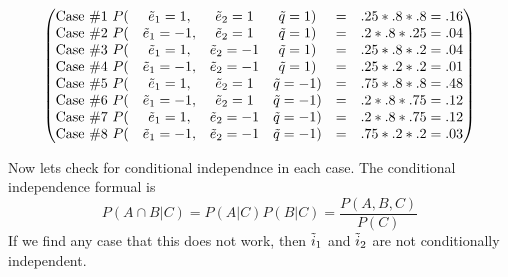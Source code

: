 \documentclass[12pt,twoside]{article}
\begin{document}
\begin{enumerate}
\begin{enumerate}
$$
    \begin{pmatrix}
    \text{Case \#1 } P( & \Tilde{e}_1 = 1, & \Tilde{e}_2 = 1 & \Tilde{q}=1) & = & .25*.8*.8 = .16\\
    \text{Case \#2 }  P( & \Tilde{e}_1 = -1, & \Tilde{e}_2 = 1 & \Tilde{q}=1) & = & .2*.8*.25 = .04\\
     \text{Case \#3 }   P( & \Tilde{e}_1 = 1, & \Tilde{e}_2 = -1 & \Tilde{q}=1) & = & .25*.8*.2 = .04\\
    \text{Case \#4 }    P( & \Tilde{e}_1 = -1, & \Tilde{e}_2 = -1 & \Tilde{q}=1) & = & .25*.2*.2 = .01\\
    \text{Case \#5 }       P( & \Tilde{e}_1 = 1, & \Tilde{e}_2 = 1 & \Tilde{q}=-1) & = & .75*.8*.8 = .48\\
    \text{Case \#6 }  P( & \Tilde{e}_1 = -1, & \Tilde{e}_2 = 1 & \Tilde{q}=-1) & = & .2*.8*.75 = .12\\
    \text{Case \#7 }    P( & \Tilde{e}_1 = 1, & \Tilde{e}_2 = -1 & \Tilde{q}=-1) & = & .2*.8*.75 = .12\\
    \text{Case \#8 }    P( & \Tilde{e}_1 = -1, & \Tilde{e}_2 = -1 & \Tilde{q}=-1) & = & .75*.2*.2 = .03\\
    \end{pmatrix} 
$$

Now lets check for conditional independnce in each case. The conditional independence formual is $$P(A\cap B | C) = P(A|C)P(B|C) = \frac{P(A,B,C)}{P(C)}$$
If we find any case that this does not work, then $\Tilde{i}_1$ and $\Tilde{i}_2$ are not conditionally independent. 


\end{enumerate}
\end{enumerate}
\end{document}

